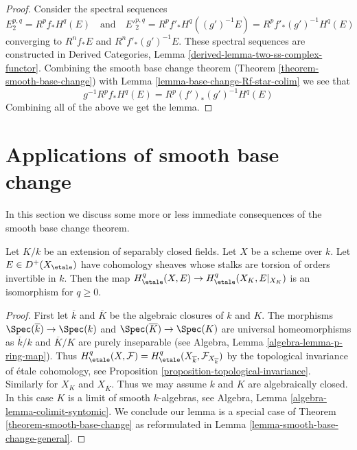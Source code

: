 \begin{proof}
Consider the spectral sequences
$$
E_2^{p, q} = R^pf_*H^q(E)
\quad\text{and}\quad
{E'}_2^{p, q} = R^pf'_*H^q((g')^{-1}E) = R^pf'_*(g')^{-1}H^q(E)
$$
converging to $R^nf_*E$ and $R^nf'_*(g')^{-1}E$.
These spectral sequences are constructed in
Derived Categories, Lemma \ref{derived-lemma-two-ss-complex-functor}.
Combining the smooth base change theorem
(Theorem \ref{theorem-smooth-base-change})
with Lemma \ref{lemma-base-change-Rf-star-colim} we see that
$$
g^{-1}R^pf_*H^q(E) = R^p(f')_*(g')^{-1}H^q(E)
$$
Combining all of the above we get the lemma.
\end{proof}












\section{Applications of smooth base change}
\label{section-applications-smooth-base-change}

\noindent
In this section we discuss some more or less immediate
consequences of the smooth base change theorem.

\begin{lemma}
\label{lemma-smooth-base-change-separably-closed}
Let $K/k$ be an extension of separably closed fields. Let $X$
be a scheme over $k$. Let $E \in D^+(X_\etale)$ have cohomology
sheaves whose stalks are torsion of orders invertible in $k$.
Then the map
$H^q_\etale(X, E) \to H^q_\etale(X_K, E|_{X_K})$
is an isomorphism for $q \geq 0$.
\end{lemma}

\begin{proof}
First let $\overline{k}$ and $\overline{K}$ be the algebraic closures
of $k$ and $K$. The morphisms $\Spec(\overline{k}) \to \Spec(k)$ and
$\Spec(\overline{K}) \to \Spec(K)$ are universal homeomorphisms
as $\overline{k}/k$ and $\overline{K}/K$ are purely inseparable
(see Algebra, Lemma \ref{algebra-lemma-p-ring-map}).
Thus $H^q_\etale(X, \mathcal{F}) =
H^q_\etale(X_{\overline{k}}, \mathcal{F}_{X_{\overline{k}}})$ by
the topological invariance of \'etale cohomology, see
Proposition \ref{proposition-topological-invariance}.
Similarly for $X_K$ and $X_{\overline{K}}$.
Thus we may assume $k$ and $K$ are algebraically closed.
In this case $K$ is a limit of smooth $k$-algebras, see
Algebra, Lemma \ref{algebra-lemma-colimit-syntomic}.
We conclude our lemma is a special case of
Theorem \ref{theorem-smooth-base-change} as reformulated in
Lemma \ref{lemma-smooth-base-change-general}.
\end{proof}












